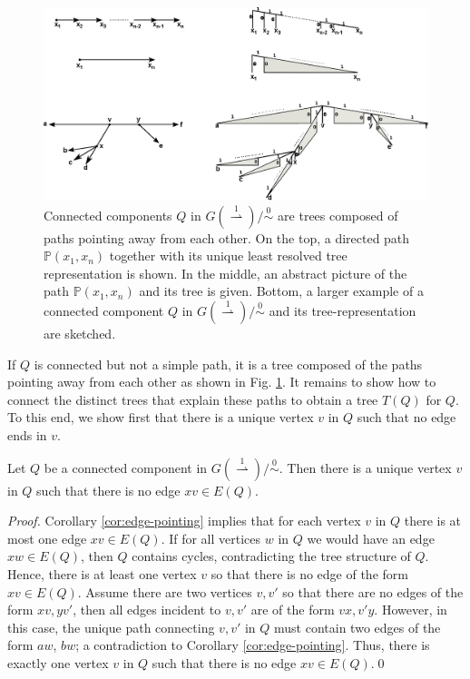 \documentclass[smallextended]{svjour3}
\newcommand{\rev}[1]{\begingroup\color{blue}#1\endgroup}
\newcommand{\TODO}[1]{\begingroup\color{red}#1\endgroup}
\newcommand{\Ro}{\mathrel{\overset{0}{\sim}}}
\newcommand{\Rld}{\mathrel{\overset{1}{\rightharpoonup}}}
\begin{document}
\begin{figure}
\begin{center}
\includegraphics[width=1.\textwidth]{di-path-tree.eps}
\end{center}
\caption{Connected components $Q$ in $G(\Rld)/\Ro$ are trees composed of
  paths pointing away from each other.  On the top, a directed path
  $\mathbb P(x_1,x_n)$ together with its unique least resolved tree
  representation is shown. In the middle, an abstract picture of the path
  $\mathbb P(x_1,x_n)$ and its tree is given.  Bottom, a larger example of
  a connected component $Q$ in $G(\Rld)/\Ro$ and its tree-representation
  are sketched.}
\label{fig:Qtree}
\end{figure}

If $Q$ is connected but not a simple path, it is a tree composed of the
paths pointing away from each other as shown in Fig. \ref{fig:Qtree}. It
remains to show how to connect the distinct trees that explain these paths
to obtain a tree $T(Q)$ for $Q$.  To this end, we show first that there is
a unique vertex $v$ in $Q$ such that no edge ends in $v$.

\begin{lemma}
  Let $Q$ be a connected component in $G(\Rld)/\Ro$.  Then there is a
  unique vertex $v$ in $Q$ such that there is no edge $xv\in E(Q)$.
  \label{lem:unique-v}
\end{lemma}
\begin{proof}
  Corollary \ref{cor:edge-pointing} implies that for each vertex $v$ in $Q$
  there is at most one edge $xv\in E(Q)$.  If for all vertices $w$ in $Q$
  we would have an edge $xw\in E(Q)$, then $Q$ contains cycles,
  contradicting the tree structure of $Q$. Hence, there is at least one
  vertex $v$ so that there is no edge of the form $xv\in E(Q)$.  
\rev{  Assume there 
  are two vertices $v,v'$ so that there are no edges of the form $xv, yv'$, 
  then all edges incident to $v,v'$ are of the form $vx, v'y$. However, 
	in this case,  the unique path connecting  $v,v'$ in $Q$ must contain two edges 
	of the form $aw$, $bw$; a contradiction to   Corollary \ref{cor:edge-pointing}.}
  Thus, there is exactly one vertex
  $v$ in $Q$ such that there is no edge $xv\in E(Q)$.\qed
\end{proof}
\end{document}
